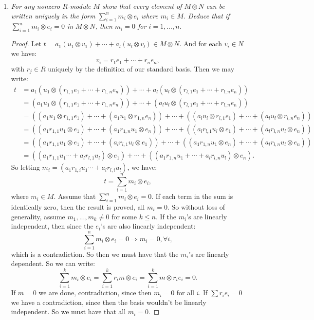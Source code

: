 \documentclass[9pt,reqno,twoside]{amsbook}
\theoremstyle{plain}
\numberwithin{section}{chapter}
\numberwithin{equation}{chapter}
\theoremstyle{definition}
\theoremstyle{remark}
\theoremstyle{plain}
\newcommand{\bee}{\begin{equation}\begin{aligned}}
\newcommand{\eee}{\end{aligned}\end{equation}}
\newcommand{\tens}{\otimes}
\renewcommand{\leq}{\leqslant}
\begin{document}
\begin{enumerate}[label=\arabic*.]
\begin{enumerate}
\item \textit{For any nonzero $R$-module $M$ show that every element of $M \tens N$ can be written uniquely in the form $\sum_{i = 1}^n m_i \tens e_i$ where $m_i \in M$. Deduce that if $\sum_{i  =1}^n m_i \tens e_i = 0$ in $M \tens N$, then $m_i = 0$ for $i  = 1,...,n$. }

\begin{proof}
Let $t = a_1(u_1 \otimes v_1) + \cdots + a_l(u_l \otimes v_l) \in M \tens N$. And for each $v_i \in N$ we have: 
$$
v_i = r_1e_1 + \cdots + r_ne_n,
$$
with $r_j \in R$ uniquely by the definition of our standard basis. Then we may write: 
\bee
t &= a_1(u_1 \tens (r_{1,1}e_1 + \cdots + r_{1,n}e_n)) + \cdots + a_l(u_l \tens (r_{l,1}e_1 + \cdots + r_{l,n}e_n))\\
&= (a_1u_1 \tens (r_{1,1}e_1 + \cdots + r_{1,n}e_n)) + \cdots + (a_lu_l \tens (r_{l,1}e_1 + \cdots + r_{l,n}e_n))\\
&= ((a_1u_1 \tens r_{1,1}e_1) + \cdots + (a_1u_1 \tens r_{1,n}e_n)) + \cdots + ((a_lu_l \tens r_{l,1}e_1) + \cdots + (a_lu_l \tens r_{l,n}e_n))\\
&= ((a_1r_{1,1}u_1 \tens e_1) + \cdots + (a_1r_{1,n}u_1 \tens e_n)) + \cdots + ((a_lr_{l,1}u_l \tens e_1) + \cdots + (a_lr_{l,n}u_l \tens e_n))\\
&= ((a_1r_{1,1}u_1 \tens e_1) + \cdots + (a_lr_{l,1}u_l \tens e_1) ) + \cdots + ((a_1r_{1,n}u_1 \tens e_n) + \cdots + (a_lr_{l,n}u_l \tens e_n))\\
&= ((a_1r_{1,1}u_1 \cdots + a_lr_{l,1}u_l) \tens e_1)  + \cdots + ((a_1r_{1,n}u_1  + \cdots + a_lr_{l,n}u_l) \tens e_n).
\eee
So letting $m_i = (a_1r_{1,i}u_1 \cdots + a_lr_{l,i}u_l)$, we have:
$$
t = \sum_{i = 1}^n m_i \tens e_i,
$$
where $m_i \in M$. Assume that $\sum_{i = 1}^n m_i \tens e_i = 0$. If each term in the sum is identically zero, then the result is proved, all $m_i = 0$. So without loss of generality, assume $m_1,...,m_k \neq 0$ for some $k \leq n$. If the $m_i$'s are linearly independent, then since the $e_i$'s are also linearly independent:
$$
\sum_{i = 1}^n m_i \tens e_i = 0 \Rightarrow m_i = 0, \forall i,
$$ which is a contradiction. So then we must have that the $m_i$'s are linearly dependent. So we can write: 
$$
\sum_{i  =1}^k m_i \tens e_i = \sum_{i  =1}^k r_i  m \tens e_i = \sum_{i  =1}^k   m \tens r_ie_i = 0.
$$
If $m = 0$ we are done, contradiction, since then $m_i = 0$ for all $i$. If $\sum r_ie_i = 0$ we have a contradiction, since then the basis wouldn't be linearly independent. So we must have that all $m_i = 0$. 
\end{proof}


\end{enumerate}
\end{enumerate}
\end{document}
